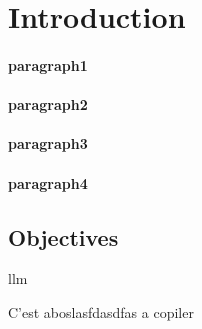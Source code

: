 \section{Introduction}

\paragraph{paragraph1}
\paragraph{paragraph2}
\paragraph{paragraph3}
\paragraph{paragraph4}

\subsection{Objectives}
\label{sec:objectives}

\gls{llm}


\cite{agarwal2024llmreasoningplanningsupportingincompleteuser}

C'est aboslasfdasdfas a copiler
